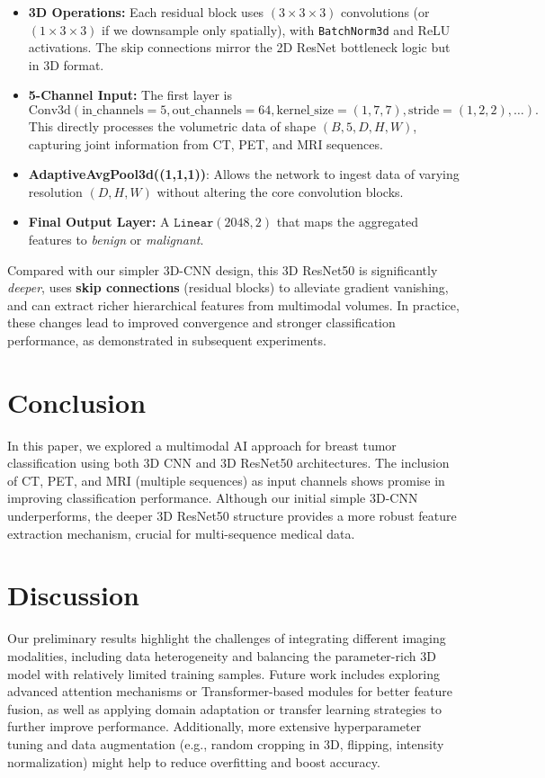 \documentclass{article}
\begin{document}
\begin{itemize}
    \item \textbf{3D Operations:} Each residual block uses $(3\times3\times3)$ convolutions (or $(1\times3\times3)$ if we downsample only spatially), with \texttt{BatchNorm3d} and ReLU activations. The skip connections mirror the 2D ResNet bottle\-neck logic but in 3D format.
    \item \textbf{5-Channel Input:} The first layer is 
    \[
    \mathrm{Conv3d}(\text{in\_channels}=5, \text{out\_channels}=64, \text{kernel\_size}=(1,7,7), \text{stride}=(1,2,2), \dots).
    \]
    This directly processes the volumetric data of shape $(B,5,D,H,W)$, capturing joint information from CT, PET, and MRI sequences.
    \item \textbf{AdaptiveAvgPool3d((1,1,1))}:  
    Allows the network to ingest data of varying resolution $(D,H,W)$ without altering the core convolution blocks.
    \item \textbf{Final Output Layer:}
    A $\texttt{Linear}(2048,2)$ that maps the aggregated features to \textit{benign} or \textit{malignant}.
\end{itemize}

Compared with our simpler 3D-CNN design, this 3D ResNet50 is significantly \textit{deeper}, uses \textbf{skip connections} (residual blocks) to alleviate gradient vanishing, and can extract richer hierarchical features from multimodal volumes. In practice, these changes lead to improved convergence and stronger classification performance, as demonstrated in subsequent experiments.


\section{Conclusion}
In this paper, we explored a multimodal AI approach for breast tumor classification using both 3D CNN and 3D ResNet50 architectures. The inclusion of CT, PET, and MRI (multiple sequences) as input channels shows promise in improving classification performance. Although our initial simple 3D-CNN underperforms, the deeper 3D ResNet50 structure provides a more robust feature extraction mechanism, crucial for multi-sequence medical data.

\section{Discussion}
Our preliminary results highlight the challenges of integrating different imaging modalities, including data heterogeneity and balancing the parameter-rich 3D model with relatively limited training samples. Future work includes exploring advanced attention mechanisms or Transformer-based modules for better feature fusion, as well as applying domain adaptation or transfer learning strategies to further improve performance. Additionally, more extensive hyperparameter tuning and data augmentation (e.g., random cropping in 3D, flipping, intensity normalization) might help to reduce overfitting and boost accuracy.
\end{document}
